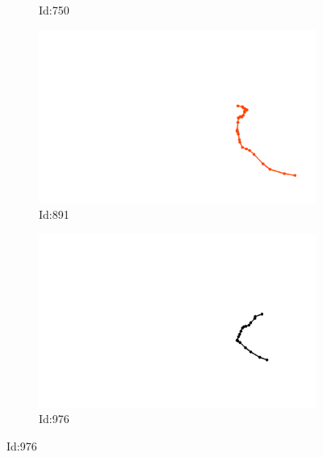 \documentclass[12pt,twoside]{report}
\begin{document}
\begin{figure}
\begin{subfigure}[b]{0.20\textwidth}
\caption{Id:750}
\end{subfigure}
\begin{subfigure}[b]{0.20\textwidth}
\centering
\includegraphics[width=\textwidth]{../../trajectories/891.png}
\caption{Id:891}
\end{subfigure}
\begin{subfigure}[b]{0.20\textwidth}
\centering
\includegraphics[width=\textwidth]{../../trajectories/976.png}
\caption{Id:976}
\end{subfigure}
\end{figure}
\end{document}
